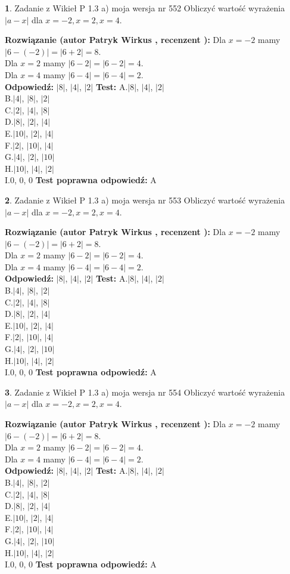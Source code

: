 \documentclass[12pt, a4paper]{article}
\theoremstyle{definition} %
\newtheorem{zad}{}
\newcommand{\zadStart}[1]{\begin{zad}#1\newline}
\newcommand{\zadStop}{\end{zad}}
\newcommand{\rozwStart}[2]{\noindent \textbf{Rozwiązanie (autor #1 , recenzent #2): }\newline}
\newcommand{\rozwStop}{\newline}
\newcommand{\odpStart}{\noindent \textbf{Odpowiedź:}\newline}
\newcommand{\odpStop}{\newline}
\newcommand{\testStart}{\noindent \textbf{Test:}\newline}
\newcommand{\testStop}{\newline}
\newcommand{\kluczStart}{\noindent \textbf{Test poprawna odpowiedź:}\newline}
\newcommand{\kluczStop}{\newline}
\begin{document}
\zadStart{Zadanie z Wikieł P 1.3 a) moja wersja nr 552}
Obliczyć wartość wyrażenia $|a - x|$ dla $x=-2,x=2,x=4$.
\zadStop
\rozwStart{Patryk Wirkus}{}
Dla $x = -2$ mamy $|6 - (-2)| = |6 + 2| = 8$.\\
Dla $x = 2$ mamy $|6 - 2| = |6 - 2| = 4$.\\
Dla $x = 4$ mamy $|6 - 4| = |6 - 4| = 2$.\\
\rozwStop
\odpStart
$|8|$, $|4|$, $|2|$
\odpStop
\testStart
A.$|8|$, $|4|$, $|2|$\\
B.$|4|$, $|8|$, $|2|$\\
C.$|2|$, $|4|$, $|8|$\\
D.$|8|$, $|2|$, $|4|$\\
E.$|10|$, $|2|$, $|4|$\\
F.$|2|$, $|10|$, $|4|$\\
G.$|4|$, $|2|$, $|10|$\\
H.$|10|$, $|4|$, $|2|$\\
I.$0$, $0$, $0$
\testStop
\kluczStart
A
\kluczStop



\zadStart{Zadanie z Wikieł P 1.3 a) moja wersja nr 553}
Obliczyć wartość wyrażenia $|a - x|$ dla $x=-2,x=2,x=4$.
\zadStop
\rozwStart{Patryk Wirkus}{}
Dla $x = -2$ mamy $|6 - (-2)| = |6 + 2| = 8$.\\
Dla $x = 2$ mamy $|6 - 2| = |6 - 2| = 4$.\\
Dla $x = 4$ mamy $|6 - 4| = |6 - 4| = 2$.\\
\rozwStop
\odpStart
$|8|$, $|4|$, $|2|$
\odpStop
\testStart
A.$|8|$, $|4|$, $|2|$\\
B.$|4|$, $|8|$, $|2|$\\
C.$|2|$, $|4|$, $|8|$\\
D.$|8|$, $|2|$, $|4|$\\
E.$|10|$, $|2|$, $|4|$\\
F.$|2|$, $|10|$, $|4|$\\
G.$|4|$, $|2|$, $|10|$\\
H.$|10|$, $|4|$, $|2|$\\
I.$0$, $0$, $0$
\testStop
\kluczStart
A
\kluczStop



\zadStart{Zadanie z Wikieł P 1.3 a) moja wersja nr 554}
Obliczyć wartość wyrażenia $|a - x|$ dla $x=-2,x=2,x=4$.
\zadStop
\rozwStart{Patryk Wirkus}{}
Dla $x = -2$ mamy $|6 - (-2)| = |6 + 2| = 8$.\\
Dla $x = 2$ mamy $|6 - 2| = |6 - 2| = 4$.\\
Dla $x = 4$ mamy $|6 - 4| = |6 - 4| = 2$.\\
\rozwStop
\odpStart
$|8|$, $|4|$, $|2|$
\odpStop
\testStart
A.$|8|$, $|4|$, $|2|$\\
B.$|4|$, $|8|$, $|2|$\\
C.$|2|$, $|4|$, $|8|$\\
D.$|8|$, $|2|$, $|4|$\\
E.$|10|$, $|2|$, $|4|$\\
F.$|2|$, $|10|$, $|4|$\\
G.$|4|$, $|2|$, $|10|$\\
H.$|10|$, $|4|$, $|2|$\\
I.$0$, $0$, $0$
\testStop
\kluczStart
A
\kluczStop
\end{document}
